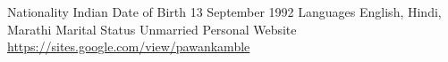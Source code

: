 

\begin{cvskills}

    \cvskill
    {Nationality} %
    {Indian} %
    \cvskill
    {Date of Birth} %
    {13 September 1992} %
    \cvskill
    {Languages} %
    {English, Hindi, Marathi} %
    \cvskill
    {Marital Status} %
    {Unmarried} %
 \cvskill
    {Personal Website} %
    {\href{https://sites.google.com/view/pawankamble}{\color{blue}https://sites.google.com/view/pawankamble}} %
\end{cvskills}
